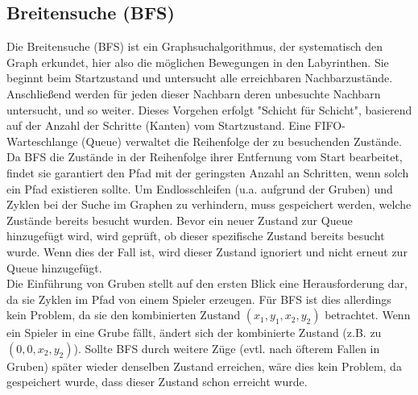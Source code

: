 \documentclass[a4paper,10pt,ngerman]{scrartcl}
\begin{document}
\subsection{Breitensuche (BFS)}
Die Breitensuche (BFS) ist ein Graphsuchalgorithmus, der systematisch den Graph erkundet, hier also die möglichen Bewegungen in den Labyrinthen. Sie beginnt beim Startzustand und untersucht alle erreichbaren Nachbarzustände. Anschließend werden für jeden dieser Nachbarn deren unbesuchte Nachbarn untersucht, und so weiter. Dieses Vorgehen erfolgt "Schicht für Schicht", basierend auf der Anzahl der Schritte (Kanten) vom Startzustand. Eine FIFO-Warteschlange (Queue) verwaltet die Reihenfolge der zu besuchenden Zustände. Da BFS die Zustände in der Reihenfolge ihrer Entfernung vom Start bearbeitet, findet sie garantiert den Pfad mit der geringsten Anzahl an Schritten, wenn solch ein Pfad existieren sollte. Um Endlosschleifen (u.a. aufgrund der Gruben) und Zyklen bei der Suche im Graphen zu verhindern, muss gespeichert werden, welche Zustände bereits besucht wurden. Bevor ein neuer Zustand zur Queue hinzugefügt wird, wird geprüft, ob dieser spezifische Zustand bereits besucht wurde. Wenn dies der Fall ist, wird dieser Zustand ignoriert und nicht erneut zur Queue hinzugefügt. 
\\\indent \indent Die Einführung von Gruben stellt auf den ersten Blick eine Herausforderung dar, da sie Zyklen im Pfad von einem Spieler erzeugen. Für BFS ist dies allerdings kein Problem, da sie den kombinierten Zustand $(x_1, y_1, x_2, y_2)$ betrachtet. Wenn ein Spieler in eine Grube fällt, ändert sich der kombinierte Zustand (z.B. zu $(0, 0, x_2, y_2)$). Sollte BFS durch weitere Züge (evtl. nach öfterem Fallen in Gruben) später wieder denselben Zustand erreichen, wäre dies kein Problem, da gespeichert wurde, dass dieser Zustand schon erreicht wurde. 
\end{document}
